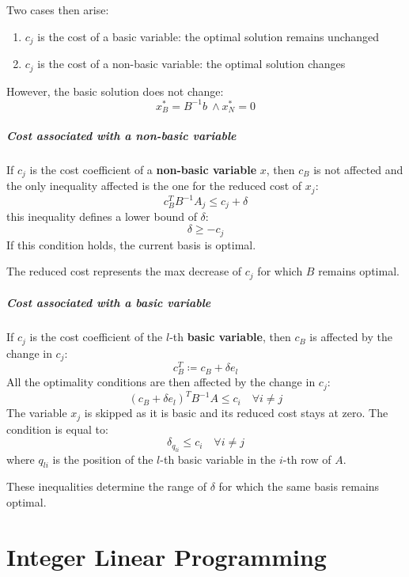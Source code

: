 \documentclass[english]{article}
\begin{document}
Two cases then arise:

\begin{enumerate}
  \item \(c_j\) is the cost of a basic variable: the optimal solution remains unchanged
  \item \(c_j\) is the cost of a non-basic variable: the optimal solution changes
\end{enumerate}

However, the basic solution does not change:
\[ x_B^\ast = B^{-1} b \ \land x_N^\ast = 0 \]

\subparagraph*{Cost associated with a non-basic variable}
If \(c_j\) is the cost coefficient of a \textbf{non-basic variable} \(x\), then \(c_B\) is not affected and the only inequality affected is the one for the reduced cost of \(x_j\):
\[ c^T_B B^{-1} A_j \leq c_j + \delta \]
this inequality defines a lower bound of \(\delta\):
\[ \delta \geq - c_j \]
If this condition holds, the current basis is optimal.

The reduced cost represents the max decrease of \(c_j\) for which \(B\) remains optimal.

\subparagraph*{Cost associated with a basic variable}
If \(c_j\) is the cost coefficient of the \(l\)-th \textbf{basic variable}, then \(c_B\) is affected by the change in \(c_j\):
\[ c^T_B \coloneqq c_B + \delta  e_l \]
All the optimality conditions are then affected by the change in \(c_j\):
\[ \left( c_B + \delta e_l \right)^T B^{-1} A \leq c_i \quad \forall i \neq j \]
The variable \(x_j\) is skipped as it is basic and its reduced cost stays at zero.
The condition is equal to:
\[ \delta_{q_{li}} \leq c_i \quad \forall i \neq j \]
where \(q_{li}\) is the position of the \(l\)-th basic variable in the \(i\)-th row of \(A\).

These inequalities determine the range of \(\delta\) for which the same basis remains optimal.

\clearpage

\section{Integer Linear Programming}
\end{document}
